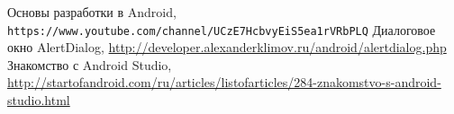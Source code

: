 \begin{thebibliography}{99999}
{}
\singlespace\normalsize

 Основы разработки в Android,  \texttt{https://www.youtube.com/channel/UCzE7HcbvyEiS5ea1rVRbPLQ}
\hfill
{} Диалоговое окно AlertDialog, \url{http://developer.alexanderklimov.ru/android/alertdialog.php}
\hfill
{} Знакомство с Android Studio, \url{http://startofandroid.com/ru/articles/listofarticles/284-znakomstvo-s-android-studio.html}
\hfill

\end{thebibliography}
